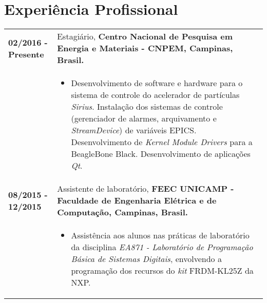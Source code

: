 \documentclass[10pt, a4paper]{article}
\begin{document}
\section{Experiência Profissional}

\begin{tabular}{p{} p{}}

\textbf{02/2016 - Presente}  & Estagiário, \textbf{Centro Nacional de Pesquisa
em Energia e Materiais - CNPEM, Campinas, Brasil.}
 \\
  & \vspace{-12pt}
  \begin{itemize}
    \item Desenvolvimento de software e hardware para o sistema de controle do
    acelerador de partículas \textit{Sirius}. Instalação dos sistemas de
    controle (gerenciador de alarmes, arquivamento e \textit{StreamDevice}) de variáveis EPICS. Desenvolvimento de
    \textit{Kernel Module Drivers} para a BeagleBone Black. Desenvolvimento de aplicações \textit{Qt}.
    
	\end{itemize}\\


\textbf{08/2015 - 12/2015}  & Assistente de laboratório, \textbf{FEEC
 UNICAMP - Faculdade de Engenharia Elétrica e de Computação, Campinas, Brasil.}
 \\
  & \vspace{-12pt}
  \begin{itemize}
    \item Assistência aos alunos nas práticas de laboratório da
    disciplina \textit{EA871 - Laboratório de Programação Básica de Sistemas
    Digitais}, envolvendo a programação dos recursos do \textit{kit} FRDM-KL25Z
    da NXP.
    
	\end{itemize}\\



\end{tabular}
\end{document}
